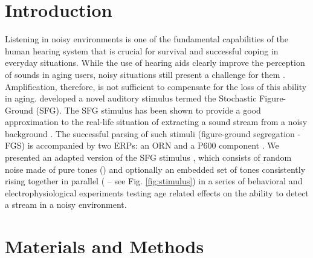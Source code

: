 \documentclass[a0,portrait]{a0poster}
\begin{document}
\vspace{0cm} %


\begin{multicols}{2} %


\color{DarkSlateGray} %

\section*{Introduction}
\large
Listening in noisy environments is one of the fundamental capabilities of the human hearing system that is crucial for survival and successful coping in everyday situations. While the use of hearing aids clearly improve the perception of sounds in aging users, noisy situations still present a challenge for them \autocite{Wu2013}. Amplification, therefore, is not sufficient to compensate for the loss of this ability in aging. \textcite{Teki2011} developed a novel auditory stimulus termed the Stochastic Figure-Ground (SFG). The SFG stimulus has been shown to provide a good approximation to the real-life situation of extracting a sound stream from a noisy background \autocite{Dykstra2017, Teki2013}. The successful parsing of such stimuli (figure-ground segregation - FGS) is accompanied by two ERPs: an ORN and a P600 component \autocite{Dykstra2017, Toth2016}. We presented an adapted version of the SFG stimulus \autocite{OSullivan2015}, which consists of random noise made of pure tones () and optionally an embedded set of tones consistently rising together in parallel ( -- see Fig. \ref{fig:stimulus}) in a series of behavioral and electrophysiological experiments testing age related effects on the ability to detect a stream in a noisy environment.

\section*{Materials and Methods}


\end{multicols}
\end{document}
